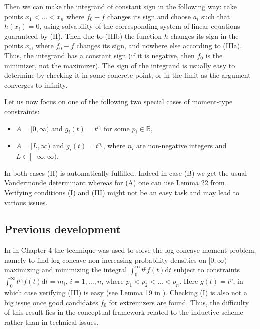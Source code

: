 \documentclass[11pt]{amsart}
\newcommand{\dd}{\mathrm{d}}
\newcommand{\1}{\mathbf{1}}
\newcommand{\R}{\mathbb{R}}
\theoremstyle{definition}
\theoremstyle{definition}
\theoremstyle{remark}
\begin{document}
\noindent Then we can make the integrand of constant sign in the following way: take points $x_1<\ldots< x_n$ where $f_0-f$ changes its sign and choose $a_i$ such that $h(x_i)=0$, using solvability of the corresponding system of linear equations guaranteed by (II). Then due to (IIIb) the function $h$ changes its sign in the points $x_i$, where $f_0-f$ changes its sign, and nowhere else according to (IIIa). Thus, the integrand has a constant sign (if it is negative, then $f_0$ is the minimizer, not the maximizer). The sign of the integrand is usually easy to determine by checking it in some concrete point, or in the limit as the argument converges to infinity.     

Let us now focus on one of the following two special cases of moment-type constraints: 
\begin{itemize}
\item[(A)] $A=[0,\infty)$ and $g_i(t)=t^{p_i}$ for some $p_i \in \R$,
\item[(B)] $A =[L,\infty)$ and $g_i(t) =t^{n_i}$, where $n_i$ are non-negative integers and $L \in[-\infty,\infty)$.
\end{itemize}
In both cases (II) is automatically fulfilled. Indeed in case (B) we get the usual Vandermonde determinant whereas for (A) one can use Lemma 22 from \cite{ENT18-2}. Verifying conditions (I) and (III) might not be an easy task and may lead to various issues. 


\subsection{Previous development}
In \cite{ENT18-2} in Chapter 4 the technique was used to solve the log-concave moment problem, namely to find log-concave non-increasing probability densities on $[0,\infty)$ maximizing and minimizing the integral $\int_0^\infty t^p f(t) \dd t$ subject to constraints $\int_0^\infty t^{p_i} f(t) \dd t = m_i$, $i=1,\ldots, n$, where $p_1<p_2<\ldots<p_n$. Here $g(t)=t^p$, in which case verifying (III) is easy (see Lemma 19 in \cite{ENT18-2}). Checking (I) is also not a big issue once good candidates $f_0$ for extremizers are found. Thus, the difficulty of this result lies in the conceptual framework related to the inductive scheme rather than in technical issues.  
\end{document}
